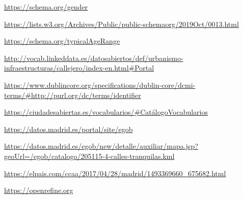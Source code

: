 \begin{thebibliography}{99}
\url{https://schema.org/gender}

\url{https://lists.w3.org/Archives/Public/public-schemaorg/2019Oct/0013.html}

\url{https://schema.org/typicalAgeRange}


\url{http://vocab.linkeddata.es/datosabiertos/def/urbanismo-infraestructuras/callejero/index-en.html#Portal}


\url{https://www.dublincore.org/specifications/dublin-core/dcmi-terms/#http://purl.org/dc/terms/identifier}


\url{https://ciudadesabiertas.es/vocabularios/#CatálogoVocabularios}


\url{https://datos.madrid.es/portal/site/egob}

\url{https://datos.madrid.es/egob/new/detalle/auxiliar/mapa.jsp?geoUrl=/egob/catalogo/205115-4-calles-tranquilas.kml}

\url{https://elpais.com/ccaa/2017/04/28/madrid/1493369660_675682.html}


\url{https://openrefine.org}


\end{thebibliography}
